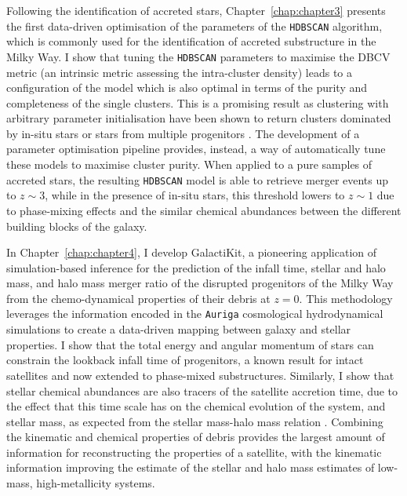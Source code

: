 Following the identification of accreted stars, Chapter~\ref{chap:chapter3} presents the first data-driven optimisation
of the parameters of the \texttt{HDBSCAN} algorithm, which is commonly used for the identification of accreted substructure 
in the Milky Way. I show that tuning the \texttt{HDBSCAN} parameters to maximise the DBCV metric (an intrinsic 
metric assessing the intra-cluster density) leads to a configuration of the model which is also optimal
in terms of the purity and completeness of the single clusters. This is a promising result as clustering
with arbitrary parameter initialisation have been shown to return clusters dominated by
in-situ stars or stars from multiple progenitors \citep{Thomas2025}. 
The development of a parameter optimisation pipeline provides, instead, a way of automatically tune these models
to maximise cluster purity. When applied to a pure samples of accreted stars, the resulting \texttt{HDBSCAN} model is able to retrieve
merger events up to $z\sim3$, while in the presence of in-situ stars, this threshold lowers to $z\sim1$ due to phase-mixing 
effects and the similar chemical abundances between the different building blocks of the galaxy.

In Chapter~\ref{chap:chapter4}, I develop GalactiKit, a pioneering application of simulation-based inference for the prediction of the infall time,
stellar and halo mass, and halo mass merger ratio of the disrupted progenitors of the Milky Way from the chemo-dynamical properties
of their debris at $z=0$. This methodology leverages the information encoded in the \texttt{Auriga} cosmological hydrodynamical simulations to create
a data-driven mapping between galaxy and stellar properties.
I show that the total energy and angular momentum of stars can constrain the
lookback infall time of progenitors, a known result for intact satellites \citep{Rocha2012} and now extended to phase-mixed substructures.
Similarly, I show that stellar chemical abundances are also tracers of the satellite accretion time, due to the effect that this 
time scale has on the chemical evolution of the system, and stellar mass, as expected from
the stellar mass-halo mass relation \citep{Kirby2013}. Combining the kinematic and chemical properties of debris
provides the largest amount of information for reconstructing the properties of a satellite, with the kinematic information improving
the estimate of the stellar and halo mass estimates of low-mass, high-metallicity systems.


